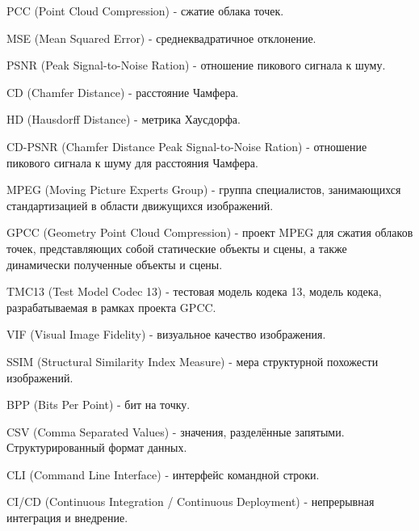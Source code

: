 \noindent PCC (Point Cloud Compression) - сжатие облака точек.

\noindent MSE (Mean Squared Error) - среднеквадратичное отклонение.

\noindent PSNR (Peak Signal-to-Noise Ration) - отношение пикового сигнала к
шуму.

\noindent CD (Chamfer Distance) - расстояние Чамфера.

\noindent HD (Hausdorff Distance) - метрика Хаусдорфа.

\noindent CD-PSNR (Chamfer Distance Peak Signal-to-Noise Ration) - отношение
пикового сигнала к шуму для расстояния Чамфера.

\noindent MPEG (Moving Picture Experts Group) - группа специалистов,
занимающихся стандартизацией в области движущихся изображений.

\noindent GPCC (Geometry Point Cloud Compression) - проект MPEG для сжатия
облаков точек, представляющих собой статические объекты и сцены, а также
динамически полученные объекты и сцены.

\noindent TMC13 (Test Model Codec 13) - тестовая модель кодека 13, модель
кодека, разрабатываемая в рамках проекта GPCC.

\noindent VIF (Visual Image Fidelity) - визуальное качество изображения.

\noindent SSIM (Structural Similarity Index Measure) - мера структурной
похожести изображений.

\noindent BPP (Bits Per Point) - бит на точку.

\noindent CSV (Comma Separated Values) - значения, разделённые запятыми.
Структурированный формат данных.

\noindent CLI (Command Line Interface) - интерфейс командной строки.

\noindent CI/CD (Continuous Integration / Continuous Deployment) - непрерывная интеграция и внедрение.
